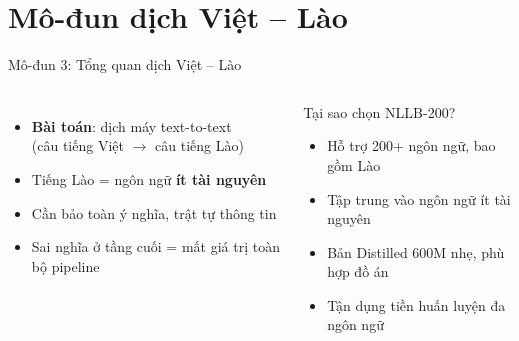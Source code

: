 ﻿\documentclass[aspectratio=169, 11pt]{beamer}
\begin{document}
\section{Mô-đun dịch Việt -- Lào}

\begin{frame}{Mô-đun 3: Tổng quan dịch Việt -- Lào}
    \begin{columns}[T]
        \begin{itemize}
            \item \textbf{Bài toán}: dịch máy text-to-text\\
            (câu tiếng Việt $\rightarrow$ câu tiếng Lào)
            \item Tiếng Lào = ngôn ngữ \textbf{ít tài nguyên}
            \item Cần bảo toàn ý nghĩa, trật tự thông tin
            \item Sai nghĩa ở tầng cuối = mất giá trị toàn bộ pipeline
        \end{itemize}

        \vspace{0.2cm}
        \centering

        \begin{block}{Tại sao chọn NLLB-200?}
            \begin{itemize}\small
                \item Hỗ trợ 200+ ngôn ngữ, bao gồm Lào
                \item Tập trung vào ngôn ngữ ít tài nguyên
                \item Bản Distilled 600M nhẹ, phù hợp đồ án
                \item Tận dụng tiền huấn luyện đa ngôn ngữ
            \end{itemize}
        \end{block}
    \end{columns}
\end{frame}
\end{document}
